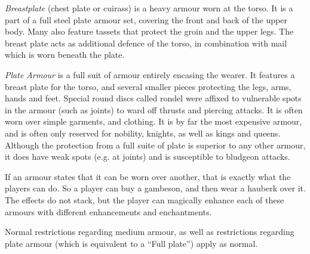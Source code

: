 \emph{Breastplate} (chest plate or cuirass) is a heavy armour worn at the
torso. It is a part of a full steel plate armour set, covering the front and
back of the upper body. Many also feature tassets that protect the groin and
the upper legs. The breast plate acts as additional defence of the torso,
in combination with mail which is worn beneath the plate.

\emph{Plate Armour} is a full suit of armour entirely encasing the wearer. It
features a breast plate for the torso, and several smaller pieces protecting
the legs, arms, hands and feet. Special round discs called rondel were affixed
to vulnerable spots in the armour (such as joints) to ward off thrusts and
piercing attacks. It is often worn over simple garments, and clothing. It is
by far the most expensive armour, and is often only reserved for nobility,
knights, as well as kings and queens. Although the protection from a full suite
of plate is superior to any other armour, it does have weak spots (e.g. at
joints) and is susceptible to bludgeon attacks.

\begin{note}
  If an armour states that it can be worn over another, that is exactly what
  the players can do. So a player can buy a gambeson, and then wear a hauberk
  over it. The effects do not stack, but the player can magically enhance each
  of these armours with different enhancements and enchantments.

  Normal restrictions regarding medium armour, as well as restrictions regarding
  plate armour (which is equivalent to a ``Full plate'') apply as normal.
\end{note}
